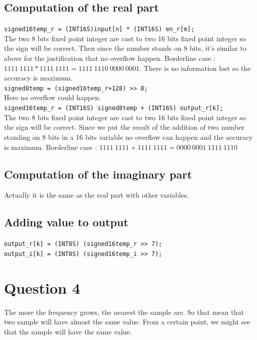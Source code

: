\documentclass[a4paper]{article}
\begin{document}
\subsection{Computation of the real part}

\verb|signed16temp_r = (INT16S)input[n] * (INT16S) en_r[m];|
\\
The two 8 bits fixed point integer are cast to two 16 bits fixed point integer so the sign will be correct.
Then since the number stands on 8 bits, it's similar to above for the justification that no overflow happen. Borderline case :   $ 1111\ 1111 * 1111\ 1111 = 1111\ 1110\ 0000\ 0001 $. There is no information lost so the accuracy is maximum.
\\
\verb|signed8temp = (signed16temp_r+128) >> 8;|
\\
Here no overflow could happen. %
\\
\verb|signed16temp_r = (INT16S) signed8temp + (INT16S) output_r[k];|
\\
The two 8 bits fixed point integer are cast to two 16 bits fixed point integer so the sign will be correct.
Since we put the result of the addition of two number standing on 8 bits in a 16 bits variable no overflow can happen and the accuracy is maximum. Borderline case : $ 1111\ 1111 + 1111\ 1111 = 0000\ 0001\ 1111\ 1110 $

\subsection{Computation of the imaginary part}

Actually it is the same as the real part with other variables.

\subsection{Adding value to output}

\verb|output_r[k] = (INT8S) (signed16temp_r >> 7);|
\\
\verb|output_i[k] = (INT8S) (signed16temp_i >> 7);|
\\



\section{Question 4}
The more the frequency grows, the nearest the sample are. So that mean that two sample will have almost the same value. From a certain point, we might see that the sample will have the same value.

\end{document}
